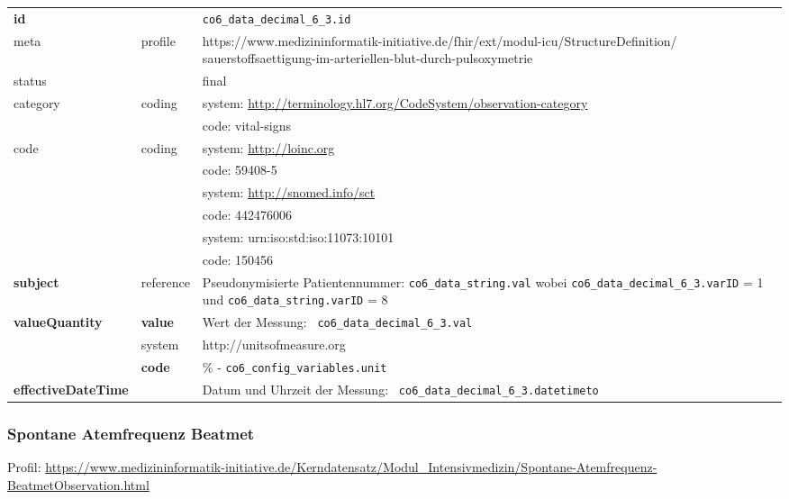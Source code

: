 \begin{longtable}{|l|l|p{7.5cm}|}
        \hline
        \rowcolor{lightgray} \multicolumn{3}{|l|}{Data Mapping (inhaltlich)} \\ \hline
        \textbf{id} &  & \texttt{co6\_data\_decimal\_6\_3.id} \\ \hline
	meta & profile & https://www.medizininformatik-initiative.de/fhir/ext/modul-icu/StructureDefinition/
	sauerstoffsaettigung-im-arteriellen-blut-durch-pulsoxymetrie \\ \hline 
	status &  & final   \\ \hline 
	category & coding & system: \url{http://terminology.hl7.org/CodeSystem/observation-category} \\
\cline{3-3}
	& & code: vital-signs \\ \hline
	code & coding & system: \url{http://loinc.org} \\ 
	\cline{3-3} 
	&  & code: 59408-5 \\ 
	\cline{3-3} 
	&  & system: \url{http://snomed.info/sct} \\ 
	\cline{3-3}
	&  & code: 442476006 \\ 
	\cline{3-3} 
	&  & system: urn:iso:std:iso:11073:10101 \\ 
	\cline{3-3}
	&  & code: 150456 \\ \hline
	\textbf{subject} & reference & Pseudonymisierte Patientennummer: \texttt{co6\_data\_string.val} wobei \texttt{co6\_data\_decimal\_6\_3.varID} = 1 und \texttt{co6\_data\_string.varID} = 8 \\ \hline
	 \textbf{valueQuantity}  & \textbf{value} & Wert der Messung: \texttt{
co6\_data\_decimal\_6\_3.val} \\
        \cline{2-3}
         & system & http://unitsofmeasure.org \\
         \cline{2-3}
         & \textbf{code} & \% - \texttt{co6\_config\_variables.unit} \\ \hline
     \textbf{effectiveDateTime}  & & Datum und Uhrzeit der Messung: \texttt{
co6\_data\_decimal\_6\_3.datetimeto} \\
     \hline
\end{longtable}


\subsubsection{Spontane Atemfrequenz Beatmet} 

Profil: \url{https://www.medizininformatik-initiative.de/Kerndatensatz/Modul_Intensivmedizin/Spontane-Atemfrequenz-BeatmetObservation.html}

